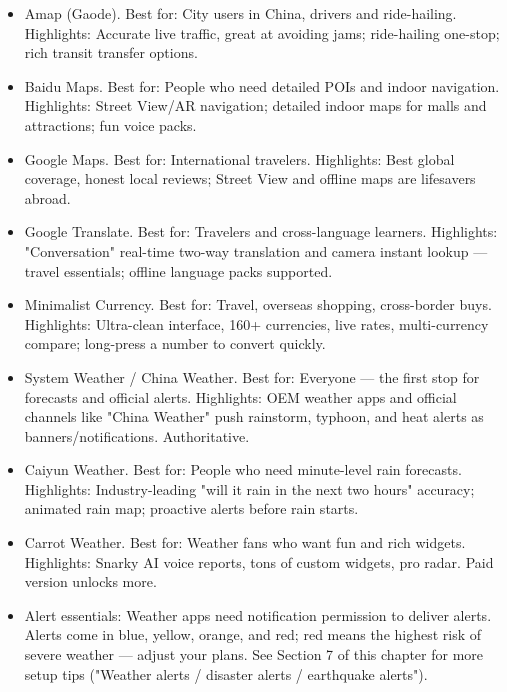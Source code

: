 
\begin{itemize}
  \item Amap (Gaode). Best for: City users in China, drivers and ride-hailing. Highlights: Accurate live traffic, great at avoiding jams; ride-hailing one-stop; rich transit transfer options.
  \item Baidu Maps. Best for: People who need detailed POIs and indoor navigation. Highlights: Street View/AR navigation; detailed indoor maps for malls and attractions; fun voice packs.
  \item Google Maps. Best for: International travelers. Highlights: Best global coverage, honest local reviews; Street View and offline maps are lifesavers abroad.
\end{itemize}


\begin{itemize}
  \item Google Translate. Best for: Travelers and cross-language learners. Highlights: "Conversation" real-time two-way translation and camera instant lookup — travel essentials; offline language packs supported.
\end{itemize}


\begin{itemize}
  \item Minimalist Currency. Best for: Travel, overseas shopping, cross-border buys. Highlights: Ultra-clean interface, 160+ currencies, live rates, multi-currency compare; long-press a number to convert quickly.
\end{itemize}


\begin{itemize}
  \item System Weather / China Weather. Best for: Everyone — the first stop for forecasts and official alerts. Highlights: OEM weather apps and official channels like "China Weather" push rainstorm, typhoon, and heat alerts as banners/notifications. Authoritative.
  \item Caiyun Weather. Best for: People who need minute-level rain forecasts. Highlights: Industry-leading "will it rain in the next two hours" accuracy; animated rain map; proactive alerts before rain starts.
  \item Carrot Weather. Best for: Weather fans who want fun and rich widgets. Highlights: Snarky AI voice reports, tons of custom widgets, pro radar. Paid version unlocks more.
  \item Alert essentials: Weather apps need notification permission to deliver alerts. Alerts come in blue, yellow, orange, and red; red means the highest risk of severe weather — adjust your plans. See Section 7 of this chapter for more setup tips ("Weather alerts / disaster alerts / earthquake alerts").
\end{itemize}

